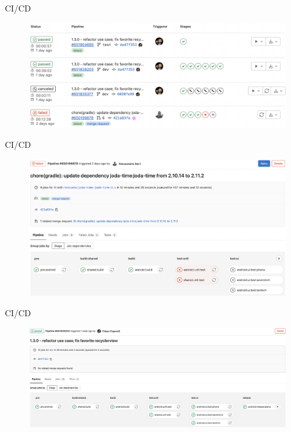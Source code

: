     \begin{frame}{CI/CD}
        \begin{figure}[H]
        \centering
        \includegraphics[width=1\textwidth]{img/Screenshot 2022-09-28 at 15.58.43.png}
        \end{figure}
    \end{frame}

    \begin{frame}{CI/CD}
        \begin{figure}[H]
        \centering
        \includegraphics[width=1\textwidth]{img/Screenshot 2022-09-28 at 15.54.26.png}
        \end{figure}
    \end{frame}

    \begin{frame}{CI/CD}
        \begin{figure}[H]
        \centering
        \includegraphics[width=1\textwidth]{img/Screenshot 2022-10-10 at 09.16.13.png}
        \end{figure}
    \end{frame}

